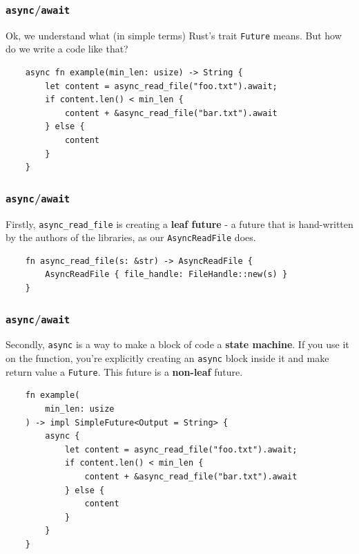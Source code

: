 \documentclass[aspectratio=1610,t]{beamer}
\begin{document}

\begin{frame}[fragile]
\frametitle{\texttt{async}/\texttt{await}}
Ok, we understand what (in simple terms) Rust's trait \texttt{Future} means. But how do we write a code like that?

\begin{verbatim}
    async fn example(min_len: usize) -> String {
        let content = async_read_file("foo.txt").await;
        if content.len() < min_len {
            content + &async_read_file("bar.txt").await
        } else {
            content
        }
    }
\end{verbatim}
\end{frame}


\begin{frame}[fragile]
\frametitle{\texttt{async}/\texttt{await}}
Firstly, \texttt{async\_read\_file} is creating a \textbf{leaf future} - a future that is hand-written by the authors of the libraries, as our \texttt{AsyncReadFile} does.

\begin{verbatim}
    fn async_read_file(s: &str) -> AsyncReadFile {
        AsyncReadFile { file_handle: FileHandle::new(s) }
    }
\end{verbatim}
\end{frame}


\begin{frame}[fragile]
\frametitle{\texttt{async}/\texttt{await}}
Secondly, \texttt{async} is a way to make a block of code a \textbf{state machine}. If you use it on the function, you're explicitly creating an \texttt{async} block inside it and make return value a \texttt{Future}. This future is a \textbf{non-leaf} future.

\begin{verbatim}
    fn example(
        min_len: usize
    ) -> impl SimpleFuture<Output = String> {
        async {
            let content = async_read_file("foo.txt").await;
            if content.len() < min_len {
                content + &async_read_file("bar.txt").await
            } else {
                content
            }
        }
    }
\end{verbatim}
\end{frame}
\end{document}
